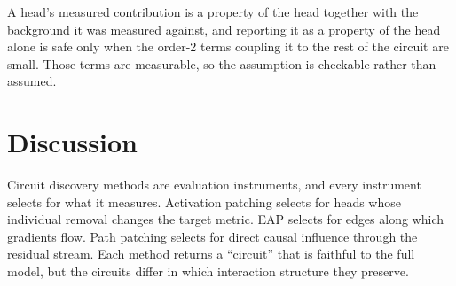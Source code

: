 \documentclass{article}
\begin{document}
A head's measured contribution is a
property of the head together with the background it was measured against, and reporting it
as a property of the head alone is safe only when the order-2 terms coupling it to the rest
of the circuit are small. Those terms are measurable, so the assumption is checkable rather
than assumed.

%
%
%
%
%



%





\section{Discussion}
\label{sec:discussion}

Circuit discovery methods are evaluation instruments, and every
instrument selects for what it measures. Activation patching selects for
heads whose individual removal changes the target metric. EAP selects
for edges along which gradients flow. Path patching selects for direct
causal influence through the residual stream. Each method returns a
``circuit'' that is faithful to the full model, but the circuits differ
in which interaction structure they preserve.
\end{document}
